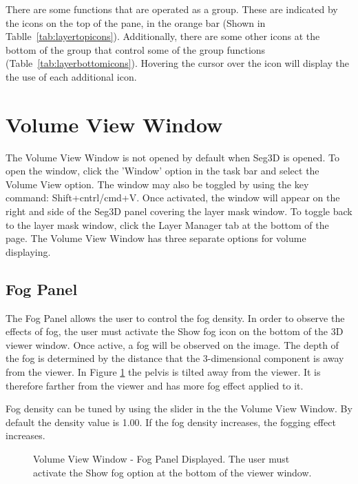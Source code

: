 \documentclass[fleqn,11pt,openany]{book}
\begin{document}
 There are some functions that are operated as a group.  These are indicated by the icons on the top of the pane, in the orange bar (Shown in Tablle~\ref{tab:layertopicons}).  Additionally, there are some other icons at the bottom of the group that control some of the group functions (Table~\ref{tab:layerbottomicons}).  Hovering the cursor over the icon will display the the use of each additional icon.




\section{Volume View Window}
The Volume View Window is not opened by default when Seg3D is opened.  
To open the window, click the 'Window' option in the task bar and select the Volume View option.  
The window may also be toggled by using the key command: Shift+cntrl/cmd+V. 
Once activated, the window will appear on the right and side of the Seg3D panel covering the layer mask window.
To toggle back to the layer mask window, click the Layer Manager tab at the bottom of the page.
The Volume View Window has three separate options for volume displaying.



\subsection{Fog Panel}
\label{sec:fog}


The Fog Panel allows the user to control the fog density.  
In order to observe the effects of fog, the user must activate the Show fog icon on the bottom of the 3D viewer window.
Once active, a fog will be observed on the image.  
The depth of the fog is determined by the distance that the 3-dimensional component is away from the viewer.   
In Figure \ref{fig:FogPanel} the pelvis is tilted away from the viewer.
It is therefore farther from the viewer and has more fog effect applied to it.

Fog density can be tuned by using the slider in the the Volume View Window.  
By default the density value is 1.00.
If the fog density increases, the fogging effect increases.
\begin{figure}[t]
\caption{Volume View Window - Fog Panel Displayed. The user must activate the Show fog option at the bottom of the viewer window.}\label{fig:FogPanel}
\end{figure}
\end{document}
